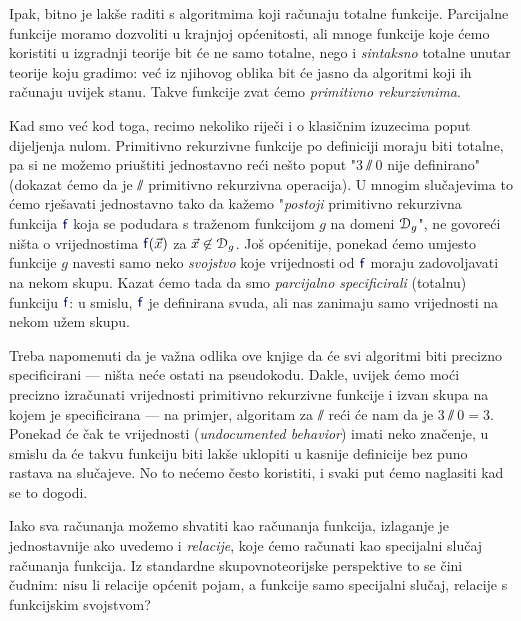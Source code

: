 Ipak, bitno je  lakše raditi s algoritmima koji računaju totalne funkcije. Parcijalne funkcije moramo dozvoliti u krajnjoj općenitosti, ali mnoge funkcije koje ćemo koristiti u izgradnji teorije bit će ne samo totalne, nego i \emph{sintaksno} totalne unutar teorije koju gradimo: već iz njihovog oblika bit će jasno da algoritmi koji ih računaju uvijek stanu. Takve funkcije zvat ćemo \emph{primitivno rekurzivnima}.

Kad smo već kod toga, recimo nekoliko riječi i o klasičnim izuzecima poput dijeljenja nulom. Primitivno rekurzivne funkcije po definiciji moraju biti totalne, pa si ne možemo priuštiti jednostavno reći nešto poput "$3\sslash0$ nije definirano" (dokazat ćemo da je $\sslash$ primitivno rekurzivna operacija). U mnogim slučajevima to ćemo rješavati jednostavno tako da kažemo "\emph{postoji} primitivno rekurzivna funkcija $\f{f}$ koja se podudara s traženom funkcijom $g$ na domeni $\mathcal D_{g}$", ne govoreći ništa o vrijednostima $\f{f}(\vec x)$ za $\vec x\not\in\mathcal D_{g}$. Još općenitije, ponekad ćemo umjesto funkcije $g$ navesti samo neko \emph{svojstvo} koje vrijednosti od $\f{f}$ moraju zadovoljavati na nekom skupu. Kazat ćemo tada da smo \emph{parcijalno specificirali} (totalnu) funkciju $\f{f}$: u smislu, $\f{f}$ je definirana svuda, ali nas zanimaju samo vrijednosti na nekom užem skupu.

Treba napomenuti da je važna odlika ove knjige da će svi algoritmi biti precizno specificirani --- ništa neće ostati na pseudokodu. Dakle, uvijek ćemo moći precizno izračunati vrijednosti primitivno rekurzivne funkcije i izvan skupa na kojem je specificirana --- na primjer, algoritam za $\sslash$ reći će nam da je $3\sslash 0=3$. Ponekad će čak te vrijednosti (\emph{undocumented behavior}) imati neko značenje, u smislu da će takvu funkciju biti lakše uklopiti u kasnije definicije bez puno rastava na slučajeve. No to nećemo često koristiti, i svaki put ćemo naglasiti kad se to dogodi.


Iako sva računanja možemo shvatiti kao računanja funkcija, izlaganje je jednostavnije ako uvedemo i \emph{relacije}, koje ćemo računati kao specijalni slučaj računanja funkcija. Iz standardne skupovnoteorijske perspektive to se čini čudnim: nisu li relacije općenit pojam, a funkcije samo specijalni slučaj, relacije s funkcijskim svojstvom?

